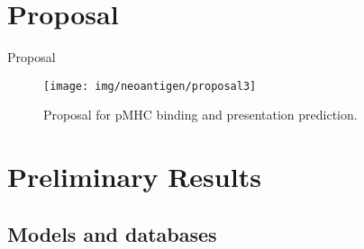 \documentclass[10pt]{beamer}
\newcommand{\1}{
	\setbeamertemplate{background}{
		\texttt{[image: img/1]}
		\tikz[overlay] \fill[fill opacity=0.75,fill=white] (0,0) rectangle (-\paperwidth,\paperheight);
	}
}
\begin{document}
\section{Proposal}



\begin{frame}{Proposal}{}
	\vspace{0.5cm}
	\begin{figure}[H]
		\centering
		\texttt{[image: img/neoantigen/proposal3]}	
		\caption{Proposal for pMHC binding and presentation prediction.}
		\label{fig:neo_det_seq}
	\end{figure}
\end{frame}




\section{Preliminary Results}

\subsection{Models and databases}
\end{document}
